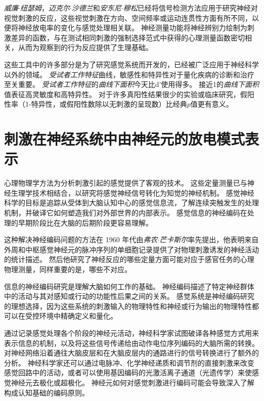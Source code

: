 \begin{proposition}
	\quad \quad \textit{威廉$\cdot$纽瑟姆}，\textit{迈克尔$\cdot$沙德兰}和\textit{安东尼$\cdot$穆松}已经将信号检测方法应用于研究神经对视觉刺激的反应，这些视觉刺激在方向、空间频率或运动连贯性方面有所不同，以便将神经放电率的变化与感觉处理相关联。
	神经测量功能将神经辨别力绘制为刺激差异的函数，与在测试相同刺激的强制选择范式中获得的心理测量函数密切相关，从而为观察到的行为反应提供了生理基础。
	
	\quad \quad 这些工具中的许多部分是为了研究感觉系统而开发的，已经被广泛应用于神经科学以外的领域。
	\textit{受试者工作特征}曲线，敏感性和特异性对于量化疾病的诊断和治疗至关重要。
	\textit{受试者工作特征}的\textit{曲线下面积}今天比d'使用得多。
	接近1的\textit{曲线下面积}值表征高灵敏度和高特异性。
	对于许多真阳性结果很少的实验或临床研究，假阳性率（1-特异性，或假阳性数除以无刺激的呈现数）比经典$ p $值更有意义。
	
\end{proposition}



\section{刺激在神经系统中由神经元的放电模式表示}
心理物理学方法为分析刺激引起的感觉提供了客观的技术。 
这些定量测量已与神经生理学技术相结合，以研究将感觉神经信号转化为知觉的神经机制。 
感觉神经科学的目标是追踪从受体到大脑认知中心的感觉信息流，了解连续突触发生的处理机制，并破译它如何塑造我们对外部世界的内部表示。
感觉信息的神经编码在处理的早期阶段比在大脑的后期阶段更容易理解。


这种解决神经编码问题的方法在 1960 年代由\textit{弗农$\cdot$芒卡斯尔}率先提出，他表明来自外周和中枢感觉神经元的脉冲序列的单细胞记录提供了对物理刺激诱发的神经活动的统计描述。
然后他研究了神经反应的哪些定量方面可能对应于感官任务的心理物理测量，同样重要的是，哪些不对应。


信息的神经编码研究是理解大脑如何工作的基础。
神经编码描述了特定神经群体中的活动与其对感知或行动的功能性后果之间的关系。 
感觉系统是神经编码研究的理想选择，因为这些系统的刺激输入的物理特性和神经或行为输出的物理特性都可以在受控环境中精确定义和量化。


通过记录感觉处理各个阶段的神经元活动，神经科学家试图破译各种感觉方式用来表示信息的机制，以及将这些信号传递给由动作电位序列编码的大脑所需的转换。 
对神经网络沿着通往大脑皮层和在大脑皮层内的通路进行的信号转换进行了额外的分析。 
神经科学家还可以通过电脉冲、化学神经递质和调节剂的直接刺激来改变感觉回路中的活动，或者可以使用基因编码的光激活离子通道（光遗传学）来使感觉神经元去极化或超极化。 
神经元如何对感觉刺激进行编码可能会导致深入了解构成认知基础的编码原则。


